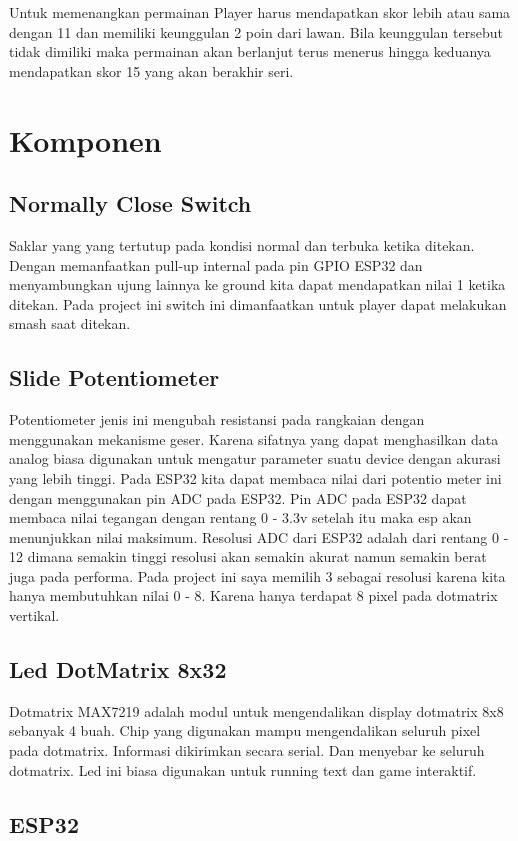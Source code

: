 \documentclass[a4paper,12pt]{article}
\begin{document}
Untuk memenangkan permainan Player harus mendapatkan skor lebih atau sama dengan 11 dan memiliki keunggulan 2 poin
dari lawan. Bila keunggulan tersebut tidak dimiliki maka permainan akan berlanjut terus menerus hingga keduanya mendapatkan skor 15
yang akan berakhir seri.

\section{Komponen}
\subsection{Normally Close Switch}
Saklar yang yang tertutup pada kondisi normal dan terbuka ketika ditekan. Dengan memanfaatkan pull-up internal
pada pin GPIO ESP32 dan menyambungkan ujung lainnya ke ground kita dapat mendapatkan nilai 1 ketika ditekan.
Pada project ini switch ini dimanfaatkan untuk player dapat melakukan smash saat ditekan.

\subsection{Slide Potentiometer}
Potentiometer jenis ini mengubah resistansi pada rangkaian dengan menggunakan mekanisme geser. Karena sifatnya
yang dapat menghasilkan data analog biasa digunakan untuk mengatur parameter suatu device dengan akurasi yang lebih
tinggi. Pada ESP32 kita dapat membaca nilai dari potentio meter ini dengan menggunakan pin ADC pada ESP32.
Pin ADC pada ESP32 dapat membaca nilai tegangan dengan rentang 0 - 3.3v setelah itu maka esp akan menunjukkan
nilai maksimum. Resolusi ADC dari ESP32 adalah dari rentang 0 - 12 dimana semakin tinggi resolusi akan semakin akurat namun
semakin berat juga pada performa. Pada project ini saya memilih 3 sebagai resolusi karena kita hanya membutuhkan
nilai 0 - 8. Karena hanya terdapat 8 pixel pada dotmatrix vertikal.

\subsection{Led DotMatrix 8x32}
Dotmatrix MAX7219 adalah modul untuk mengendalikan display dotmatrix 8x8 sebanyak 4 buah. Chip yang digunakan mampu
mengendalikan seluruh pixel pada dotmatrix. Informasi dikirimkan secara serial. Dan menyebar ke seluruh dotmatrix.
Led ini biasa digunakan untuk running text dan game interaktif.

\subsection{ESP32}
\end{document}
